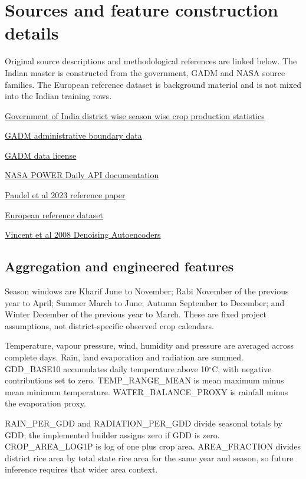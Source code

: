 \documentclass[11pt,a4paper]{article}
\begin{document}
\clearpage\section*{Sources and feature construction details}
Original source descriptions and methodological references are linked below. The Indian master is constructed from the government, GADM and NASA source families. The European reference dataset is background material and is not mixed into the Indian training rows.

\href{https://data.gov.in/resource/district-wise-season-wise-crop-production-statistics-1997}{Government of India district wise season wise crop production statistics}\par
\href{https://gadm.org/data.html}{GADM administrative boundary data}\par
\href{https://gadm.org/license.html}{GADM data license}\par
\href{https://power.larc.nasa.gov/docs/services/api/temporal/daily/}{NASA POWER Daily API documentation}\par
\href{https://doi.org/10.1016/j.compag.2023.107663}{Paudel et al 2023 reference paper}\par
\href{https://doi.org/10.5281/zenodo.5561113}{European reference dataset}\par
\href{https://doi.org/10.1145/1390156.1390294}{Vincent et al 2008 Denoising Autoencoders}\par
\subsection*{Aggregation and engineered features}
Season windows are Kharif June to November; Rabi November of the previous year to April; Summer March to June; Autumn September to December; and Winter December of the previous year to March. These are fixed project assumptions, not district-specific observed crop calendars.

Temperature, vapour pressure, wind, humidity and pressure are averaged across complete days. Rain, land evaporation and radiation are summed. GDD\_BASE10 accumulates daily temperature above 10$^\circ$C, with negative contributions set to zero. TEMP\_RANGE\_MEAN is mean maximum minus mean minimum temperature. WATER\_BALANCE\_PROXY is rainfall minus the evaporation proxy.

RAIN\_PER\_GDD and RADIATION\_PER\_GDD divide seasonal totals by GDD; the implemented builder assigns zero if GDD is zero. CROP\_AREA\_LOG1P is log of one plus crop area. AREA\_FRACTION divides district rice area by total state rice area for the same year and season, so future inference requires that wider area context.
\end{document}
